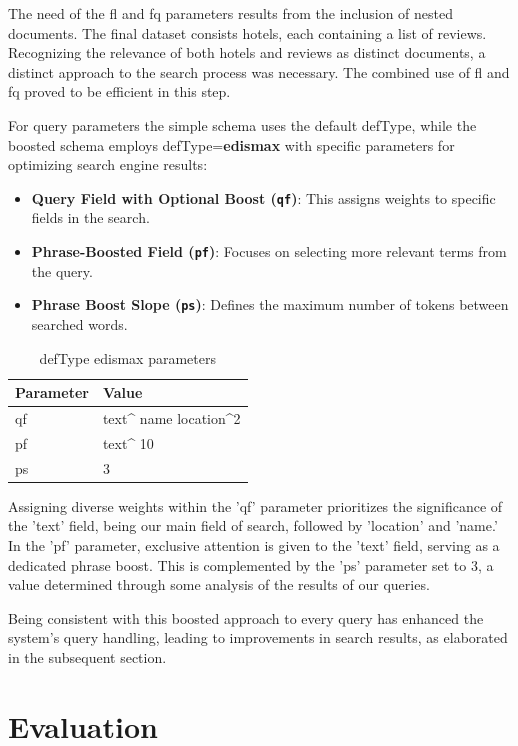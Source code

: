 \documentclass[sigconf]{acmart}
\begin{document}
The need of the fl and fq parameters results from the inclusion of nested documents. The final dataset consists hotels, each containing a list of reviews. Recognizing the relevance of both hotels and reviews as distinct documents, a distinct approach to the search process was necessary. The combined use of fl and fq proved to be efficient in this step.

For query parameters the simple schema uses the default defType, while the boosted schema employs defType=\textbf{edismax} with specific parameters for optimizing search engine results:

\begin{itemize}
    \item \textbf{Query Field with Optional Boost (\texttt{qf})}: This assigns weights to specific fields in the search.
    \item \textbf{Phrase-Boosted Field (\texttt{pf})}: Focuses on selecting more relevant terms from the query.
    \item \textbf{Phrase Boost Slope (\texttt{ps})}: Defines the maximum number of tokens between searched words.
\end{itemize}

\begin{table}[H]
\small
\caption{defType edismax parameters}
\label{tab:edismax_par}
\begin{tabular}{ll}
\toprule
Parameter & Value\\
\midrule
qf & text\textasciicircum{} name location\textasciicircum{}2
  \\
pf & text\textasciicircum{} 10 \\
ps & 3 \\
\bottomrule
\end{tabular}
\end{table}

Assigning diverse weights within the 'qf' parameter prioritizes the significance of the 'text' field, being our main field of search, followed by 'location' and 'name.' In the 'pf' parameter, exclusive attention is given to the 'text' field, serving as a dedicated phrase boost. This is complemented by the 'ps' parameter set to 3, a value determined through some analysis of the results of our queries.

Being consistent with this boosted approach to every query has enhanced the system's query handling, leading to improvements in search results, as elaborated in the subsequent section.

\section{ Evaluation }
\end{document}
